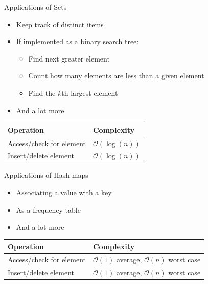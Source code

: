 \documentclass{beamer}
\begin{document}
\begin{frame}[plain]{Applications of Sets}
    \begin{itemize}
        \item Keep track of distinct items
        \item If implemented as a binary search tree:
        \begin{itemize}
            \item Find next greater element
            \item Count how many elements are less than a given element
            \item Find the $k$th largest element
        \end{itemize}
        \item And a lot more
    \end{itemize}
    \vspace*{1cm}
    \begin{center}
    \begin{tabular}{l|l}
    Operation & Complexity \\ \hline
    Access/check for element & $\mathcal{O}(\log(n))$ \\
    Insert/delete element & $\mathcal{O}(\log(n))$ \\
    \end{tabular}
    \end{center}
\end{frame}

\begin{frame}[plain]{Applications of Hash maps}
    \begin{itemize}
        \item Associating a value with a key
        \item As a frequency table
        \item And a lot more
    \end{itemize}
    \vspace*{1cm}
    \begin{center}
    \begin{tabular}{l|l}
    Operation & Complexity \\ \hline
    Access/check for element & $\mathcal{O}(1)$ average, $\mathcal{O}(n)$ worst case \\
    Insert/delete element & $\mathcal{O}(1)$ average, $\mathcal{O}(n)$ worst case \\
    \end{tabular}
    \end{center}
\end{frame}
\end{document}
